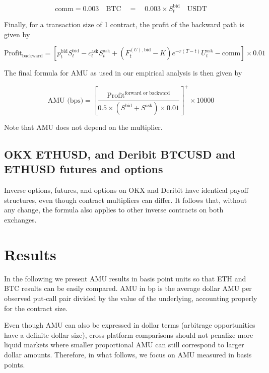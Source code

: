 \documentclass[12pt]{article}
\begin{document}
    \begin{equation}
    \text{comm} = 0.003 \quad \text{BTC} \quad = \quad 0.003 \times S_t^\text{bid} \quad \text{USDT}
    \end{equation}

Finally, for a transaction size of 1 contract, the profit of the backward path is given by

\begin{equation}
\text{Profit}_\text{backward}
=
\left[
p_t^{\text{bid}} S_t^{\text{bid}}
-
c_t^{\text{ask}} S_t^{\text{ask}}
+
(F^{(U),\text{bid}}_t - K)e^{-r(T-t)} U_t^{\text{ask}}
-
\text{comm}
\right]\times 0.01
\end{equation}

The final formula for AMU as used in our empirical analysis is then given by

\begin{equation}
    \text{AMU (bps)} = \left[
        \frac{\text{Profit}^\text{forward or backward}}{0.5\times(S^\text{bid} + S^\text{ask})\times 0.01}
    \right]^+\times 10000
\end{equation}

Note that AMU does not depend on the multiplier.

\subsection{OKX ETHUSD, and Deribit BTCUSD and ETHUSD futures and options}

Inverse options, futures, and options on OKX and Deribit have identical payoff structures, even though contract multipliers can differ. It follows that, without any change, the formula also applies to other inverse contracts on both exchanges.



\section{Results}

In the following we present AMU results in basis point units so that ETH and BTC results can be easily compared. AMU in bp is the average dollar AMU per observed put-call pair divided by the value of the underlying, accounting properly for the contract size.

Even though AMU can also be expressed in dollar terms (arbitrage opportunities have a definite dollar size), cross-platform comparisons should not penalize more liquid markets where smaller proportional AMU can still correspond to larger dollar amounts. Therefore, in what follows, we focus on AMU measured in basis points.
\end{document}
